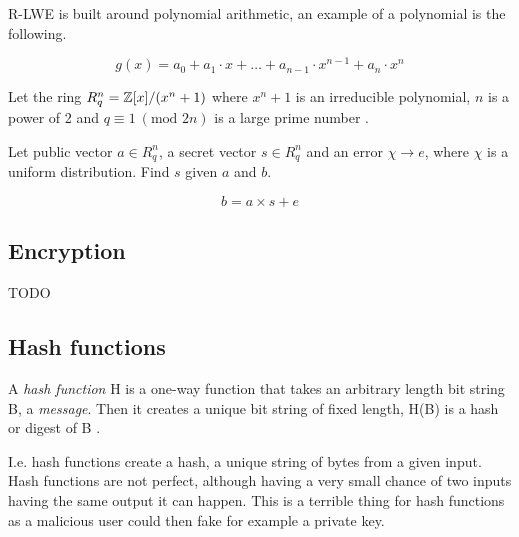 \begin{definition}

    R-LWE is built around polynomial arithmetic, an example of a polynomial is
    the following.

    \[ g(x) = a_0 + a_1 \cdot x + \ldots + a_{n-1} \cdot x^{n-1} + a_n \cdot x^n \]

    Let the ring $R_q^n = \mathbb{Z}[x]/(x^n + 1)$ where $x^n + 1$ is an irreducible
    polynomial, $n$ is a power of 2 and $q \equiv 1\ (\text{mod } 2n)$ is a
    large prime number \citep{FPGA_Post_Quantum_Primitives}.

    Let public vector $a \in R_q^n$, a secret vector $s \in R_q^n$ and an error
    $\chi \rightarrow e$, where $\chi$ is a uniform distribution. Find $s$
    given $a$ and $b$.

    \[b = a \times s + e \]

\end{definition}

\subsection{Encryption}
TODO

\subsection{Hash functions}
\begin{definition}

A \textit{hash function} H is a one-way function that takes an arbitrary length
bit string B, a \textit{message}. Then it creates a unique bit string of fixed
length, H(B) is a hash or digest of B \cite{FranciscoRodriguez-Henriquez10}.

\end{definition}

I.e. hash functions create a hash, a unique string of bytes from a given input.
Hash functions are not perfect, although having a very small chance of two
inputs having the same output it can happen. This is a terrible thing for hash
functions as a malicious user could then fake for example a private key.


